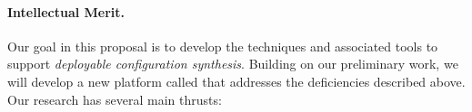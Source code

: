 
\paragraph*{Intellectual Merit.}
Our goal in this proposal is to develop the techniques and associated tools
to support {\em deployable configuration synthesis}.  Building on our preliminary work, we will develop a new platform called \Name that addresses the deficiencies described above.  Our research has several main thrusts:

